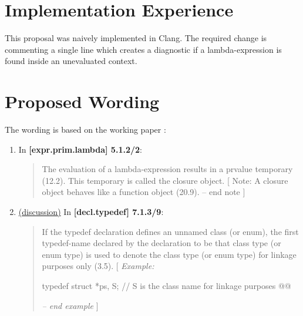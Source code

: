 \documentclass{wg21}
\begin{document}
\section{Implementation Experience}
This proposal was naively implemented in Clang. The required change is commenting
a single line which creates a diagnostic if a lambda-expression is found inside an
unevaluated context.


\section{Proposed Wording}
The wording is based on the working paper \cite{N4606}:

\begin{enumerate}
  \item \label{wording.remove}
    In \textbf{[expr.prim.lambda] 5.1.2/2}:
    \begin{quote}
      The evaluation of a lambda-expression results in a prvalue temporary
      (12.2). This temporary is called the closure object.  [ Note: A closure object behaves like
      a function object (20.9). -- end note ]
    \end{quote}

  \item \label{wording.non-template} \hyperref[discussion.non-template]{(discussion)}
    In \textbf{[decl.typedef] 7.1.3/9}:
    \begin{quote}
      If the typedef declaration defines an unnamed class (or enum), the first
      typedef-name declared by the declaration to be that class type (or enum type)
      is used to denote the class type (or enum type) for linkage purposes only (3.5).
      [ \textit{Example:}
\begin{codeblock}
typedef struct { } *ps, S; // S is the class name for linkage purposes
@@
\end{codeblock}
      \textit{-- end example} ]
    \end{quote}


\end{enumerate}
\end{document}
